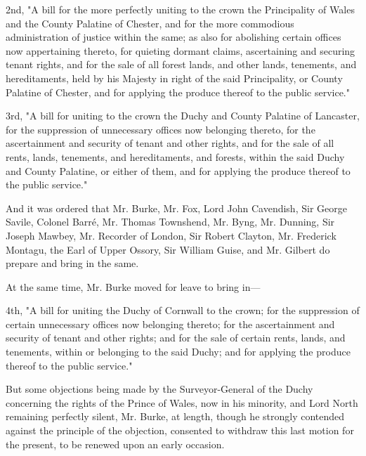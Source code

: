2nd, "A bill for the more perfectly uniting to the crown the Principality of Wales and the County Palatine of Chester, and for the more commodious administration of justice within the same; as also for abolishing certain offices now appertaining thereto, for quieting dormant claims, ascertaining and securing tenant rights, and for the sale of all forest lands, and other lands, tenements, and hereditaments, held by his Majesty in right of the said Principality, or County Palatine of Chester, and for applying the produce thereof to the public service."

3rd, "A bill for uniting to the crown the Duchy and County Palatine of Lancaster, for the suppression of unnecessary offices now belonging thereto, for the ascertainment and security of tenant and other rights, and for the sale of all rents, lands, tenements, and hereditaments, and forests, within the said Duchy and County Palatine, or either of them, and for applying the produce thereof to the public service."

And it was ordered that Mr. Burke, Mr. Fox, Lord John Cavendish, Sir George Savile, Colonel Barré, Mr. Thomas Townshend, Mr. Byng, Mr. Dunning, Sir Joseph Mawbey, Mr. Recorder of London, Sir Robert Clayton, Mr. Frederick Montagu, the Earl of Upper Ossory, Sir William Guise, and Mr. Gilbert do prepare and bring in the same.

At the same time, Mr. Burke moved for leave to bring in—

4th, "A bill for uniting the Duchy of Cornwall to the crown; for the suppression of certain unnecessary offices now belonging thereto; for the ascertainment and security of tenant and other rights; and for the sale of certain rents, lands, and tenements, within or belonging to the said Duchy; and for applying the produce thereof to the public service."

But some objections being made by the Surveyor-General of the Duchy concerning the rights of the Prince of Wales, now in his minority, and Lord North remaining perfectly silent, Mr. Burke, at length, though he strongly contended against the principle of the objection, consented to withdraw this last motion for the present, to be renewed upon an early occasion.



